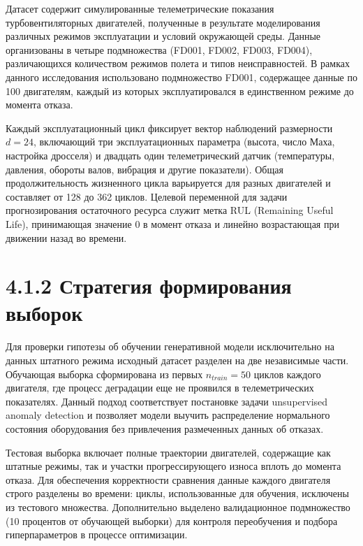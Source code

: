 \documentclass[14pt, a4paper, oneside]{extreport}
\begin{document}
Датасет содержит симулированные телеметрические показания турбовентиляторных двигателей, полученные в результате моделирования различных режимов эксплуатации и условий окружающей среды. Данные организованы в четыре подмножества (FD001, FD002, FD003, FD004), различающихся количеством режимов полета и типов неисправностей. В рамках данного исследования использовано подмножество FD001, содержащее данные по 100 двигателям, каждый из которых эксплуатировался в единственном режиме до момента отказа.

Каждый эксплуатационный цикл фиксирует вектор наблюдений размерности $d = 24$, включающий три эксплуатационных параметра (высота, число Маха, настройка дросселя) и двадцать один телеметрический датчик (температуры, давления, обороты валов, вибрация и другие показатели). Общая продолжительность жизненного цикла варьируется для разных двигателей и составляет от 128 до 362 циклов. Целевой переменной для задачи прогнозирования остаточного ресурса служит метка RUL (Remaining Useful Life), принимающая значение 0 в момент отказа и линейно возрастающая при движении назад во времени.

\vspace{1em}
\section{4.1.2 Стратегия формирования выборок}
\vspace{1em}

Для проверки гипотезы об обучении генеративной модели исключительно на данных штатного режима исходный датасет разделен на две независимые части. Обучающая выборка сформирована из первых $n_{train} = 50$ циклов каждого двигателя, где процесс деградации еще не проявился в телеметрических показателях. Данный подход соответствует постановке задачи unsupervised anomaly detection и позволяет модели выучить распределение нормального состояния оборудования без привлечения размеченных данных об отказах.

Тестовая выборка включает полные траектории двигателей, содержащие как штатные режимы, так и участки прогрессирующего износа вплоть до момента отказа. Для обеспечения корректности сравнения данные каждого двигателя строго разделены во времени: циклы, использованные для обучения, исключены из тестового множества. Дополнительно выделено валидационное подмножество (10 процентов от обучающей выборки) для контроля переобучения и подбора гиперпараметров в процессе оптимизации.

\vspace{1em}
\end{document}
